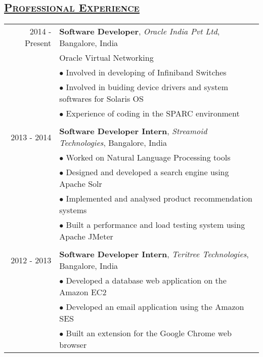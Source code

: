 \documentclass[14pt]{article}
\begin{document}
\subsection* {\scshape\LARGE\uline {Professional Experience}}
\large
\begin{tabular}{r l}
2014 - Present & \textbf{Software Developer}, \textit{Oracle India Pvt Ltd}, Bangalore, India \\
		          & Oracle Virtual Networking\\ 
			   & $\bullet$ Involved in developing of Infiniband Switches\\
			   & $\bullet$ Involved in buiding device drivers and system softwares for  Solaris OS\\
			   & $\bullet$ Experience of coding in the SPARC environment	    
\\ \\

2013 - 2014 & \textbf{Software Developer Intern}, \textit{Streamoid Technologies}, Bangalore, India \\ 
			& $\bullet$ Worked on Natural Language Processing tools \\
			& $\bullet$ Designed and developed a search engine using Apache Solr \\
   			& $\bullet$ Implemented and analysed product recommendation systems \\
			& $\bullet$ Built a performance and load testing system using Apache JMeter
\\ \\

2012 - 2013 & \textbf{Software Developer Intern}, \textit{Teritree Technologies}, Bangalore, India \\ 
			& $\bullet$ Developed a database web application on the Amazon EC2 \\
			& $\bullet$ Developed an email application using the Amazon SES\\
			& $\bullet$ Built an extension for the Google Chrome web browser	    
\end{tabular}
\end{document}
